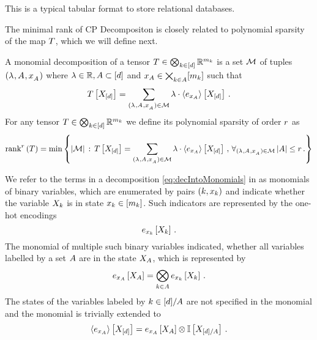 This is a typical tabular format to store relational databases.


The minimal rank of CP Decompositon is closely related to polynomial sparsity of the map $T$, which we will define next.

\begin{definition}\label{def:polynomialSparsity}
	A monomial decomposition of a tensor $T\in\bigotimes_{k\in[d]} \mathbb{R}^{m_{k}}$ is a set $\mathcal{M}$ of tuples $(\lambda^{}, A^{}, x_{A^{}}^{})$ where $\lambda\in\mathbb{R}, A\subset[d]$ and $x_{A}\in\bigtimes_{k\in A} [m_{k}]$ such that
	\begin{align}\label{eq:decIntoMonomials}
		T\left[X_{[d]}\right] = \sum_{(\lambda^{}, A^{}, x_{A^{}}^{})\in\mathcal{M}} \lambda \cdot \left\langle e_{x_{A}}\right\rangle \left[ X_{[d]} \right] \, .
	\end{align}
	For any tensor $T\in\bigotimes_{k\in[d]} \mathbb{R}^{m_{k}}$ we define its polynomial sparsity of order $r$ as
	\begin{align*}
		\mathrm{rank}^{r}\left(T\right) =
		 \min \left\{ \left|\mathcal{M}\right| \, : \, 
		 	T\left[X_{[d]}\right] = \sum_{(\lambda^{}, A^{}, x_{A^{}}^{})\in\mathcal{M}} \lambda \cdot \left\langle e_{x_{A}}\right\rangle \left[ X_{[d]} \right] \, , \, \forall_{(\lambda^{}, A^{}, x_{A^{}}^{})\in\mathcal{M}} \left|A\right| \leq r \, . 
		 \right\}
	\end{align*}
\end{definition}


We refer to the terms in a decomposition \eqref{eq:decIntoMonomials} in  as monomials of binary variables, which are enumerated by pairs $(k,x_{k})$ and indicate whether the variable $X_{k}$ is in state $x_{k}\in[m_{k}]$.
Such indicators are represented by the one-hot encodings
	\[ e_{x_{k}}\left[X_{k}\right] \, . \]
The monomial of multiple such binary variables indicated, whether all variables labelled by a set $A$ are in the state $X_{A}$, which is represented by
	\[ e_{x_{A}}\left[X_{A}\right] = \bigotimes_{k\in A} e_{x_{k}}\left[X_{k}\right]  \, . \]
The states of the variables labeled by $k\in[d]/A$ are not specified in the monomial and the monomial is trivially extended to
	\[ \left\langle e_{x_{A}}\right\rangle \left[ X_{[d]} \right]  = e_{x_{A}}\left[X_{A}\right] \otimes \mathbb{I}\left[X_{[d]/A}\right] \, .   \]


